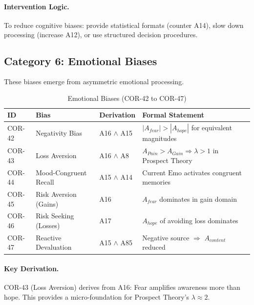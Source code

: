 \paragraph{Intervention Logic.} To reduce cognitive biases: provide statistical formats (counter A14), slow down processing (increase A12), or use structured decision procedures.


\subsection{Category 6: Emotional Biases}

These biases emerge from asymmetric emotional processing.

\begin{table}[htbp]
\small
\centering
\caption{Emotional Biases (COR-42 to COR-47)}
\label{tab:cor-emotional}
\begin{tabular}{p{1.2cm}p{2.8cm}p{3.8cm}p{5cm}}
\toprule
\textbf{ID} & \textbf{Bias} & \textbf{Derivation} & \textbf{Formal Statement} \\
\midrule
COR-42 & Negativity Bias & A16 $\land$ A15 & $|A_{fear}| > |A_{hope}|$ for equivalent magnitudes \\
COR-43 & Loss Aversion & A16 $\land$ A8 & $A_{Pain} > A_{Gain} \Rightarrow \lambda > 1$ in Prospect Theory \\
COR-44 & Mood-Congruent Recall & A15 $\land$ A14 & Current $\text{Emo}$ activates congruent memories \\
COR-45 & Risk Aversion (Gains) & A16 & $A_{fear}$ dominates in gain domain \\
COR-46 & Risk Seeking (Losses) & A17 & $A_{hope}$ of avoiding loss dominates \\
COR-47 & Reactive Devaluation & A15 $\land$ A85 & Negative source $\Rightarrow$ $A_{content}$ reduced \\
\bottomrule
\end{tabular}
\end{table}

\paragraph{Key Derivation.} COR-43 (Loss Aversion) derives from A16: Fear amplifies awareness more than hope. This provides a micro-foundation for Prospect Theory's $\lambda \approx 2$.

